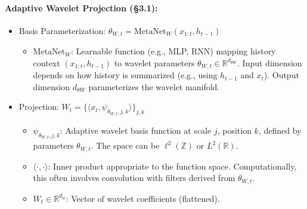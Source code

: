 \documentclass{article}
\begin{document}
\paragraph{Adaptive Wavelet Projection (\S3.1):}
\begin{itemize}
    \item Basis Parameterization: $\theta_{W,t} = \text{MetaNet}_W(x_{1:t}, h_{t-1})$
        \begin{itemize}
        \item $\text{MetaNet}_W$: Learnable function (e.g., MLP, RNN) mapping history context $(x_{1:t}, h_{t-1})$ to wavelet parameters $\theta_{W,t} \in \mathbb{R}^{d_{\theta W}}$. Input dimension depends on how history is summarized (e.g., using $h_{t-1}$ and $x_t$). Output dimension $d_{\theta W}$ parameterizes the wavelet manifold.
        \end{itemize}
    \item Projection: $W_t = \{\langle x_t, \psi_{\theta_{W,t},j,k} \rangle\}_{j,k}$
        \begin{itemize}
        \item $\psi_{\theta_{W,t},j,k}$: Adaptive wavelet basis function at scale $j$, position $k$, defined by parameters $\theta_{W,t}$. The space can be $\ell^2(\mathbb{Z})$ or $L^2(\mathbb{R})$.
        \item $\langle \cdot, \cdot \rangle$: Inner product appropriate to the function space. Computationally, this often involves convolution with filters derived from $\theta_{W,t}$.
        \item $W_t \in \mathbb{R}^{d_w}$: Vector of wavelet coefficients (flattened).
        \end{itemize}
\end{itemize}
\end{document}

